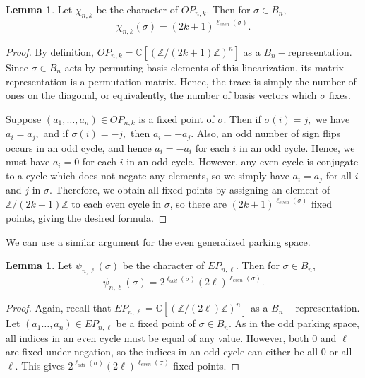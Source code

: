 \documentclass{amsart}
\theoremstyle{plain}
\theoremstyle{definition}
\newtheorem{lemma}[theorem]{Lemma}
\newcommand{\Z}{\mathbb{Z}}
\begin{document}
\begin{lemma}\label{lemma: odd character formula}
   Let $\chi_{n,k}$ be the character of $OP_{n,k}.$ Then for $\sigma\in B_n,$ 
   $$\chi_{n,k}(\sigma)= (2k+1)^{\ell_{even}(\sigma)}.$$
    
\end{lemma}
\begin{proof}
  By definition, $OP_{n,k} = \mathbb{C}[(\mathbb Z/(2k+1)\mathbb Z)^n]$ as a $B_n-$representation. Since $\sigma\in B_n$ acts by permuting basis elements of this linearization, its matrix representation is a permutation matrix. Hence, the trace is simply the number of ones on the diagonal, or equivalently, the number of basis vectors which $\sigma $ fixes.   
  
  Suppose $(a_1,\dots, a_n)\in OP_{n,k}$ is a fixed point of $\sigma.$ Then if $\sigma(i)=j,$ we have $a_i=a_j,$ and if $\sigma(i)=-j,$ then $a_i=-a_j.$ Also, an odd number of sign flips occurs in an odd cycle, and hence $a_i=-a_i$ for each $i$ in an odd cycle. Hence, we must have $a_i=0$ for each $i$ in an odd cycle. However,  any even cycle is conjugate to a cycle which does not negate any elements, so we simply have $a_i=a_j$ for all $i$ and $j$ in $\sigma.$ Therefore, we obtain all fixed points by assigning an element of $\Z/(2k+1)\Z $ to each even cycle in $\sigma$, so there are $(2k+1)^{\ell_{even}(\sigma)}$ fixed points, giving the desired formula. 
\end{proof}
We can use a similar argument for the even generalized parking space. 
\begin{lemma}\label{lemma: even character formula}
  Let $\psi_{n,\ell}(\sigma)$ be the character of $EP_{n,\ell}$. Then for $\sigma\in B_n,$ 
  $$\psi_{n,\ell}(\sigma)= 2^{\ell_{odd}(\sigma)}(2\ell)^{\ell_{even}(\sigma)}.$$
\end{lemma}
\begin{proof}
    Again, recall that $EP_{n,\ell} = \mathbb{C}[(\mathbb Z/(2\ell)\mathbb Z)^n]$ as a $B_n-$representation. Let $(a_1\dots, a_n)\in EP_{n,\ell}$ be a fixed point of $\sigma\in B_n$. As in the odd parking space, all indices in an even cycle must be equal of any value. However, both $0$ and $\ell$ are fixed under negation, so the indices in an odd cycle can either be all $0$ or all $\ell.$ This gives $2^{\ell_{odd}(\sigma)}(2\ell)^{\ell_{even}(\sigma)}$ fixed points.
\end{proof}
\end{document}
